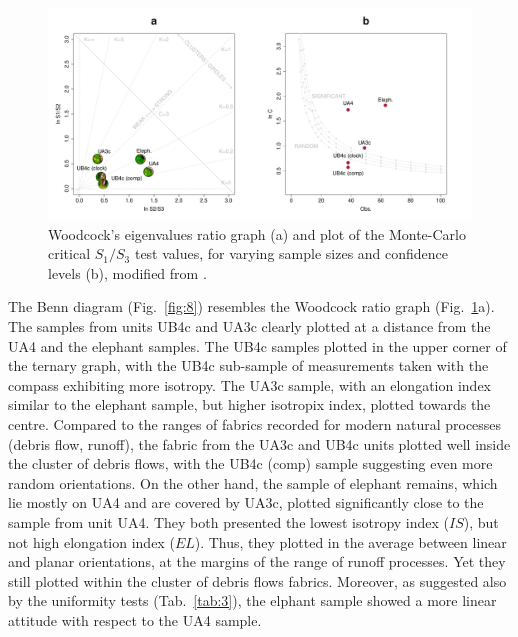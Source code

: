 \documentclass[preprint,authoryear,times]{elsarticle} %
\begin{document}
\begin{figure}[]
  \centering
  \includegraphics[width=1\textwidth]{../artwork/Fig7.pdf}
  \caption{Woodcock's eigenvalues ratio graph (a) and plot of the Monte-Carlo critical $S_1/S_3$ test values, for varying sample sizes and confidence levels (b), modified from \cite{Woodcock1983}.}
  \label{fig:7}
\end{figure}

The Benn diagram (Fig.~\ref{fig:8}) resembles the Woodcock ratio graph (Fig.~\ref{fig:7}a). The samples from units UB4c and UA3c clearly plotted at a distance from the UA4 and the elephant samples. The UB4c samples plotted in the upper corner of the ternary graph, with the UB4c sub-sample of measurements taken with the compass exhibiting more isotropy. The UA3c sample, with an elongation index similar to the elephant sample, but higher isotropix index, plotted towards the centre. Compared to the ranges of fabrics recorded for modern natural processes (debris flow, runoff), the fabric from the UA3c and UB4c units plotted well inside the cluster of debris flows, with the UB4c (comp) sample suggesting even more random orientations. On the other hand, the sample of elephant remains, which lie mostly on UA4 and are covered by UA3c, plotted significantly close to the sample from unit UA4. They both presented the lowest isotropy index ($IS$), but not high elongation index ($EL$). Thus, they plotted in the average between linear and planar orientations, at the margins of the range of runoff processes. Yet they still plotted within the cluster of debris flows fabrics. Moreover, as suggested also by the uniformity tests (Tab.~\ref{tab:3}), the elphant sample showed a more linear attitude with respect to the UA4 sample.
\end{document}
